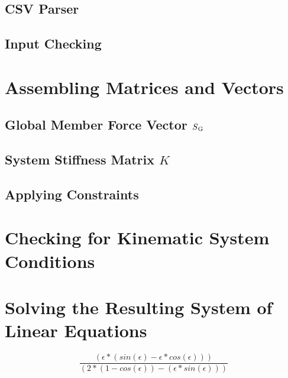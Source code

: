 \subsection{CSV Parser}
\label{sec:csvparse}

\subsection{Input Checking}
\label{sec:inputcheck}


\section{Assembling Matrices and Vectors}
\label{sec:asmmatrvec}

\subsection{Global Member Force Vector $S\textsubscript{G}$}
\label{sec:asmSG}

\subsection{System Stiffness Matrix $K$}
\label{sec:asmK}

\subsection{Applying Constraints}
\label{sec:applyconst}


\section{Checking for Kinematic System Conditions}
\label{sec:kinesyscheck}


\section{Solving the Resulting System of Linear Equations}
\label{sec:solver}




\begin{equation} \label{constA}
\frac{(\epsilon * (sin(\epsilon) - \epsilon * cos(\epsilon)))}
{(2 * (1 - cos(\epsilon)) - (\epsilon * sin(\epsilon)))}
\end{equation}